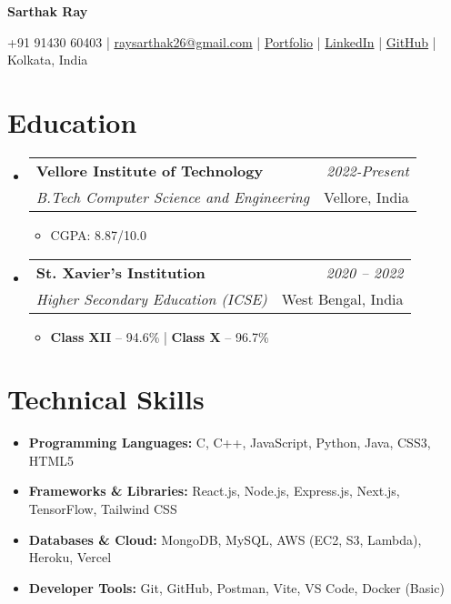 \documentclass[a4paper,11pt]{article}
\makeatletter
\newcommand{\resumeSubheading}[4]{
\vspace{0.2mm}\item
    \begin{tabular*}{0.98\textwidth}[t]{l@{\extracolsep{\fill}}r}
        \textbf{#1} & \textit{\footnotesize{#4}} \\
        \textit{\footnotesize{#3}} &  \footnotesize{#2}\\
    \end{tabular*}
    \vspace{-2mm}
}
\newcommand{\resumeSubHeadingListStart}{\begin{itemize}[leftmargin=*,labelsep=1mm]}
\newcommand{\resumeHeadingSkillStart}{\begin{itemize}[leftmargin=*,itemsep=1.7mm, rightmargin=2ex]}
\newcommand{\resumeItemListStart}{\begin{itemize}[leftmargin=*,labelsep=1mm,itemsep=0.5mm]}
\newcommand{\resumeSubHeadingListEnd}{\end{itemize}\vspace{1mm}}
\newcommand{\resumeHeadingSkillEnd}{\end{itemize}\vspace{-1mm}}
\newcommand{\resumeItemListEnd}{\end{itemize}\vspace{-1mm}}
\newcommand{\socialicon}[1]{\raisebox{-0.05em}{\resizebox{!}{1em}{#1}}}
\newcommand{\headerfontiii}{\fontfamily{ppl}\selectfont} %
\makeatother
\begin{document}
\headerfontiii

\begin{center}
    {\Large\textbf{Sarthak Ray}}
\end{center}
\vspace{-4mm}

\begin{center}
    \footnotesize{
    +91 91430 60403 | \href{mailto:raysarthak26@gmail.com}{raysarthak26@gmail.com} | 
    \href{https://sarthakray.me/}{Portfolio} | 
    \socialicon{\faLinkedin} \href{https://www.linkedin.com/in/sarthak-ray-683910256}{LinkedIn} | 
    \socialicon{\faGithub} \href{https://github.com/sarthakray26}{GitHub} | 
    Kolkata, India
    }
\end{center}
\vspace{-2mm}

\section{\textbf{Education}}
\vspace{-0.4mm}
\resumeSubHeadingListStart

\resumeSubheading
{Vellore Institute of Technology}{Vellore, India}
{B.Tech Computer Science and Engineering}{2022-Present}
\resumeItemListStart
\item CGPA: 8.87/10.0 
\resumeItemListEnd

\resumeSubheading
{St. Xavier's Institution}{West Bengal, India}
{Higher Secondary Education (ICSE)}{2020 – 2022}
\resumeItemListStart
\item \textbf{Class XII} – 94.6\% | \textbf{Class X} – 96.7\%
\resumeItemListEnd

\resumeSubHeadingListEnd
\vspace{-2mm}

\section{\textbf{Technical Skills}}
\vspace{-0.2mm}
\resumeHeadingSkillStart
\item \textbf{Programming Languages:} C, C++, JavaScript, Python, Java, CSS3, HTML5
\item \textbf{Frameworks \& Libraries:} React.js, Node.js, Express.js, Next.js, TensorFlow, Tailwind CSS
\item \textbf{Databases \& Cloud:} MongoDB, MySQL, AWS (EC2, S3, Lambda), Heroku, Vercel
\item \textbf{Developer Tools:} Git, GitHub, Postman, Vite, VS Code, Docker (Basic)
\resumeHeadingSkillEnd
\vspace{-1mm}
\end{document}
